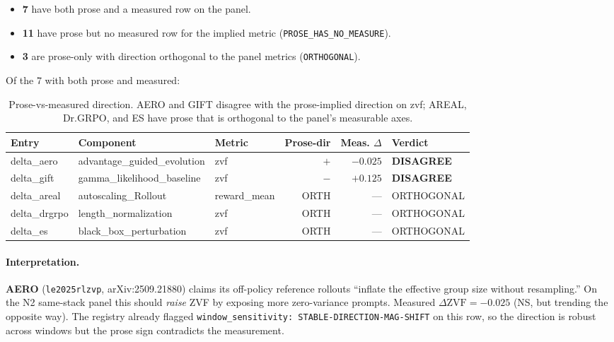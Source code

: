 \begin{itemize}
\item \textbf{7} have both prose and a measured row on the panel.
\item \textbf{11} have prose but no measured row for the implied metric
(\texttt{PROSE\_HAS\_NO\_MEASURE}).
\item \textbf{3} are prose-only with direction orthogonal to the panel
metrics (\texttt{ORTHOGONAL}).
\end{itemize}

Of the 7 with both prose and measured:

\begin{table}[h]
\centering
\small
\begin{tabular}{lllrrl}
\toprule
Entry & Component & Metric & Prose-dir & Meas. $\Delta$ & Verdict \\
\midrule
delta\_aero  & advantage\_guided\_evolution & zvf         & $+$   & $-0.025$ & \textbf{DISAGREE} \\
delta\_gift  & gamma\_likelihood\_baseline   & zvf         & $-$   & $+0.125$ & \textbf{DISAGREE} \\
delta\_areal & autoscaling\_Rollout         & reward\_mean & ORTH  & ---      & ORTHOGONAL \\
delta\_drgrpo & length\_normalization       & zvf         & ORTH  & ---      & ORTHOGONAL \\
delta\_es    & black\_box\_perturbation      & zvf         & ORTH  & ---      & ORTHOGONAL \\
\bottomrule
\end{tabular}
\caption{Prose-vs-measured direction. AERO and GIFT disagree with the
prose-implied direction on zvf; AREAL, Dr.GRPO, and ES have prose that
is orthogonal to the panel's measurable axes.}
\label{tab:p6-iter150-prose}
\end{table}

\paragraph{Interpretation.}
\textbf{AERO} (\texttt{le2025rlzvp}, arXiv:2509.21880) claims its
off-policy reference rollouts ``inflate the effective group size
without resampling.'' On the N2 same-stack panel this should \emph{raise}
ZVF by exposing more zero-variance prompts. Measured $\Delta \text{ZVF}
= -0.025$ (NS, but trending the opposite way). The registry already
flagged \texttt{window\_sensitivity: STABLE-DIRECTION-MAG-SHIFT} on this
row, so the direction is robust across windows but the prose sign
contradicts the measurement.

